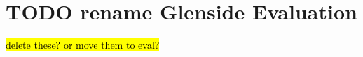 \section{TODO rename Glenside Evaluation}
\label{sec:case-studies}

%  
%  
%


\hl{delete these? or move them to eval?}

